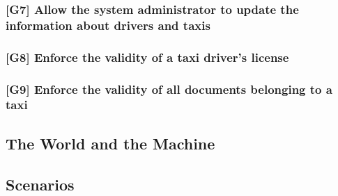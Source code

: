 \documentclass[a4paper,12pt]{article}%
\begin{document}
\subsubsection{{[}G7{]} Allow the system administrator to update the information about drivers and taxis}
\label{goal7}
\subsubsection{{[}G8{]} Enforce the validity of a taxi driver's license}
\label{goal8}
\subsubsection{{[}G9{]} Enforce the validity of all  documents belonging to a taxi}
\label{goal9}
\subsection{The World and the Machine}
\subsection{Scenarios}
\end{document}
